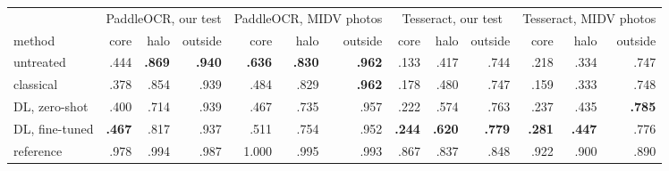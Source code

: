 \begin{tabular}{lrrrrrrrrrrrr}
\toprule
 & \multicolumn{3}{c}{PaddleOCR, our test} & \multicolumn{3}{c}{PaddleOCR, MIDV photos} & \multicolumn{3}{c}{Tesseract, our test} & \multicolumn{3}{c}{Tesseract, MIDV photos} \\
\cmidrule(lr){2-4}\cmidrule(lr){5-7}\cmidrule(lr){8-10}\cmidrule(lr){11-13}
method & core & halo & outside & core & halo & outside & core & halo & outside & core & halo & outside \\
\midrule
untreated & .444 & \textbf{.869} & \textbf{.940} & \textbf{.636} & \textbf{.830} & \textbf{.962} & .133 & .417 & .744 & .218 & .334 & .747 \\
classical & .378 & .854 & .939 & .484 & .829 & \textbf{.962} & .178 & .480 & .747 & .159 & .333 & .748 \\
DL, zero-shot & .400 & .714 & .939 & .467 & .735 & .957 & .222 & .574 & .763 & .237 & .435 & \textbf{.785} \\
DL, fine-tuned & \textbf{.467} & .817 & .937 & .511 & .754 & .952 & \textbf{.244} & \textbf{.620} & \textbf{.779} & \textbf{.281} & \textbf{.447} & .776 \\
\midrule
reference & .978 & .994 & .987 & 1.000 & .995 & .993 & .867 & .837 & .848 & .922 & .900 & .890 \\
\bottomrule
\end{tabular}
